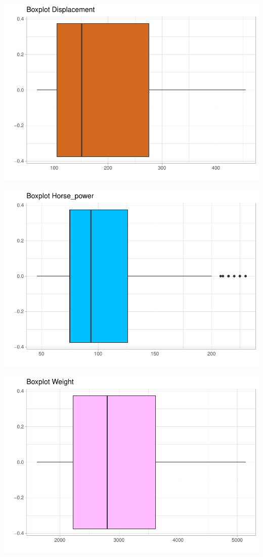 \begin{center}\includegraphics{img/EDA_files/figure-latex/unnamed-chunk-8-1} \end{center}
\begin{center}\includegraphics{img/EDA_files/figure-latex/unnamed-chunk-8-2} \end{center}
\begin{center}\includegraphics{img/EDA_files/figure-latex/unnamed-chunk-8-3} \end{center}
